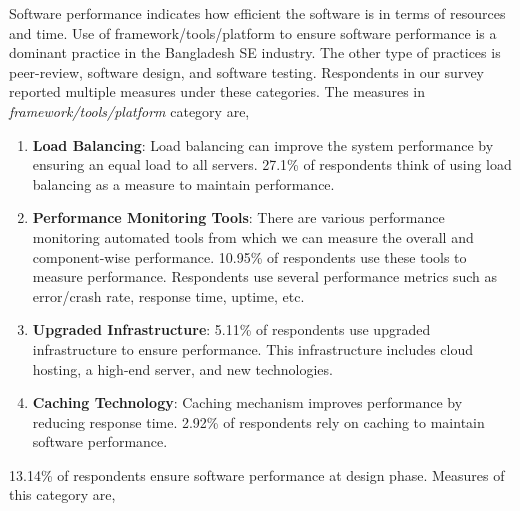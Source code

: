 Software performance indicates how efficient the software is in terms of resources and time. Use of framework/tools/platform to ensure software performance is a dominant practice in the Bangladesh SE industry. The other type of practices is peer-review, software design, and software testing. Respondents in our survey reported multiple measures under these categories. The measures in \emph{framework/tools/platform} category are,
\begin{enumerate}[label=(\alph*)]

    \item \textbf{Load Balancing}: Load balancing can improve the system performance by ensuring an equal load to all servers. 27.1\% of respondents think of using load balancing as a measure to maintain performance.
    
    
    \item \textbf{Performance Monitoring Tools}: There are various performance monitoring automated tools from which we can measure the overall and component-wise performance. 10.95\% of respondents use these tools to measure performance. Respondents use several performance metrics such as error/crash rate, response time, uptime, etc.
    
    \item \textbf{Upgraded Infrastructure}: 5.11\% of respondents use upgraded infrastructure to ensure performance. This infrastructure includes cloud hosting, a high-end server, and new technologies.
    
    \item \textbf{Caching Technology}: Caching mechanism improves performance by reducing response time. 2.92\% of respondents rely on caching to maintain software performance.

\end{enumerate}


13.14\% of respondents ensure software performance  at design phase. Measures of this category are,

